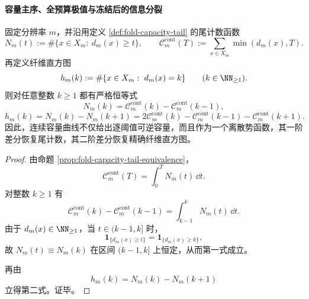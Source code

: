 \paragraph{容量主序、全预算极值与冻结后的信息分裂}

\begin{theorem}[连续容量曲线的离散势反演]\label{thm:fold-capacity-discrete-potential-histogram}
固定分辨率 \(m\)，并沿用定义 \ref{def:fold-capacity-tail} 的尾计数函数
\[
N_m(t):=\#\{x\in X_m:\ d_m(x)\ge t\},
\qquad
\mathcal C_m^{\mathrm{cont}}(T):=\sum_{x\in X_m}\min(d_m(x),T).
\]
再定义纤维直方图
\[
h_m(k):=\#\{x\in X_m:\ d_m(x)=k\}
\qquad(k\in\NN_{\ge 1}).
\]
则对任意整数 \(k\ge 1\) 都有严格恒等式
\[
N_m(k)=\mathcal C_m^{\mathrm{cont}}(k)-\mathcal C_m^{\mathrm{cont}}(k-1),
\]
\[
h_m(k)=N_m(k)-N_m(k+1)
=2\mathcal C_m^{\mathrm{cont}}(k)-\mathcal C_m^{\mathrm{cont}}(k-1)-\mathcal C_m^{\mathrm{cont}}(k+1).
\]
因此，连续容量曲线不仅给出逐阈值可逆容量，而且作为一个离散势函数，其一阶差分恢复尾计数，其二阶差分恢复精确纤维直方图。
\end{theorem}
\begin{proof}
由命题 \ref{prop:fold-capacity-tail-equivalence}，
\[
\mathcal C_m^{\mathrm{cont}}(T)=\int_0^T N_m(t)\,\dd t.
\]
对整数 \(k\ge 1\) 有
\[
\mathcal C_m^{\mathrm{cont}}(k)-\mathcal C_m^{\mathrm{cont}}(k-1)
=\int_{k-1}^{k}N_m(t)\,\dd t.
\]
由于 \(d_m(x)\in\NN_{\ge 1}\)，当 \(t\in(k-1,k]\) 时，
\[
\mathbf 1_{\{d_m(x)\ge t\}}=\mathbf 1_{\{d_m(x)\ge k\}},
\]
故 \(N_m(t)\equiv N_m(k)\) 在区间 \((k-1,k]\) 上恒定，从而第一式成立。

再由
\[
h_m(k)=N_m(k)-N_m(k+1)
\]
立得第二式。证毕。
\end{proof}

